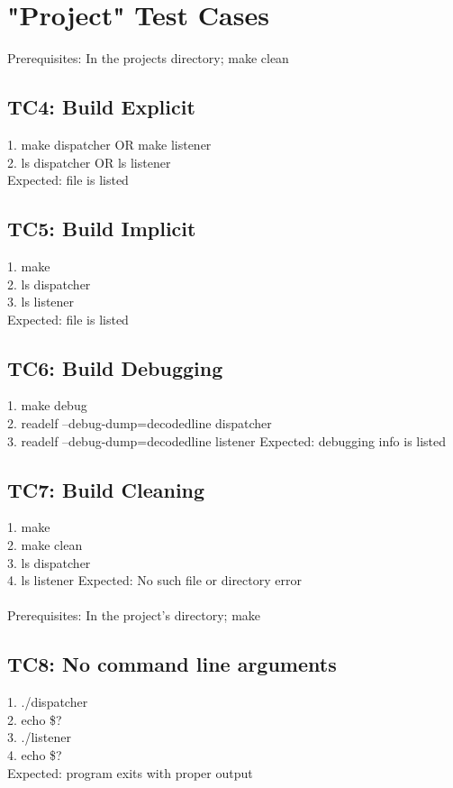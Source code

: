 \documentclass{article}
\begin{document}
  \section*{"Project" Test Cases}
  Prerequisites: In the projects directory; make clean
  \subsection*{TC4: Build Explicit}
1. make dispatcher OR make listener\\
2. ls dispatcher OR ls listener\\
Expected: file is listed\\

\subsection*{TC5: Build Implicit}
1. make\\
2. ls dispatcher\\
3. ls listener\\
Expected: file is listed\\
\subsection*{TC6: Build Debugging}
1. make debug\\
2. readelf --debug-dump=decodedline dispatcher\\
3. readelf --debug-dump=decodedline listener
Expected: debugging info is listed\\
\subsection*{TC7: Build Cleaning}
1. make\\
2. make clean\\
3. ls dispatcher\\
4. ls listener
Expected: No such file or directory error\\
\\
Prerequisites: In the project's directory; make\\
\subsection*{TC8: No command line arguments}
1. ./dispatcher\\
2. echo \$?\\
3. ./listener\\
4. echo \$?\\
Expected: program exits with proper output \\
\end{document}
